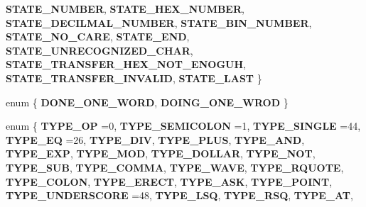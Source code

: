 \begin{DoxyCompactItemize}
\newline
{\bfseries S\+T\+A\+T\+E\+\_\+\+N\+U\+M\+B\+ER}, 
{\bfseries S\+T\+A\+T\+E\+\_\+\+H\+E\+X\+\_\+\+N\+U\+M\+B\+ER}, 
{\bfseries S\+T\+A\+T\+E\+\_\+\+D\+E\+C\+I\+L\+M\+A\+L\+\_\+\+N\+U\+M\+B\+ER}, 
{\bfseries S\+T\+A\+T\+E\+\_\+\+B\+I\+N\+\_\+\+N\+U\+M\+B\+ER}, 
\newline
{\bfseries S\+T\+A\+T\+E\+\_\+\+N\+O\+\_\+\+C\+A\+RE}, 
{\bfseries S\+T\+A\+T\+E\+\_\+\+E\+ND}, 
{\bfseries S\+T\+A\+T\+E\+\_\+\+U\+N\+R\+E\+C\+O\+G\+N\+I\+Z\+E\+D\+\_\+\+C\+H\+AR}, 
{\bfseries S\+T\+A\+T\+E\+\_\+\+T\+R\+A\+N\+S\+F\+E\+R\+\_\+\+H\+E\+X\+\_\+\+N\+O\+T\+\_\+\+E\+N\+O\+G\+UH}, 
\newline
{\bfseries S\+T\+A\+T\+E\+\_\+\+T\+R\+A\+N\+S\+F\+E\+R\+\_\+\+I\+N\+V\+A\+L\+ID}, 
{\bfseries S\+T\+A\+T\+E\+\_\+\+L\+A\+ST}
 \}
\item 
\mbox{\label{class_lexical_parser_a12dd26d3545560df5fc12d2c5035b470}} 
enum \{ {\bfseries D\+O\+N\+E\+\_\+\+O\+N\+E\+\_\+\+W\+O\+RD}, 
{\bfseries D\+O\+I\+N\+G\+\_\+\+O\+N\+E\+\_\+\+W\+R\+OD}
 \}
\item 
\mbox{\label{class_lexical_parser_a747ce4bb92b4236438d5d88e890c1e62}} 
enum \{ \newline
{\bfseries T\+Y\+P\+E\+\_\+\+OP} =0, 
{\bfseries T\+Y\+P\+E\+\_\+\+S\+E\+M\+I\+C\+O\+L\+ON} =1, 
{\bfseries T\+Y\+P\+E\+\_\+\+S\+I\+N\+G\+LE} =44, 
{\bfseries T\+Y\+P\+E\+\_\+\+EQ} =26, 
\newline
{\bfseries T\+Y\+P\+E\+\_\+\+D\+IV}, 
{\bfseries T\+Y\+P\+E\+\_\+\+P\+L\+US}, 
{\bfseries T\+Y\+P\+E\+\_\+\+A\+ND}, 
{\bfseries T\+Y\+P\+E\+\_\+\+E\+XP}, 
\newline
{\bfseries T\+Y\+P\+E\+\_\+\+M\+OD}, 
{\bfseries T\+Y\+P\+E\+\_\+\+D\+O\+L\+L\+AR}, 
{\bfseries T\+Y\+P\+E\+\_\+\+N\+OT}, 
{\bfseries T\+Y\+P\+E\+\_\+\+S\+UB}, 
\newline
{\bfseries T\+Y\+P\+E\+\_\+\+C\+O\+M\+MA}, 
{\bfseries T\+Y\+P\+E\+\_\+\+W\+A\+VE}, 
{\bfseries T\+Y\+P\+E\+\_\+\+R\+Q\+U\+O\+TE}, 
{\bfseries T\+Y\+P\+E\+\_\+\+C\+O\+L\+ON}, 
\newline
{\bfseries T\+Y\+P\+E\+\_\+\+E\+R\+E\+CT}, 
{\bfseries T\+Y\+P\+E\+\_\+\+A\+SK}, 
{\bfseries T\+Y\+P\+E\+\_\+\+P\+O\+I\+NT}, 
{\bfseries T\+Y\+P\+E\+\_\+\+U\+N\+D\+E\+R\+S\+C\+O\+RE} =48, 
\newline
{\bfseries T\+Y\+P\+E\+\_\+\+L\+SQ}, 
{\bfseries T\+Y\+P\+E\+\_\+\+R\+SQ}, 
{\bfseries T\+Y\+P\+E\+\_\+\+AT}, 

\end{DoxyCompactItemize}
